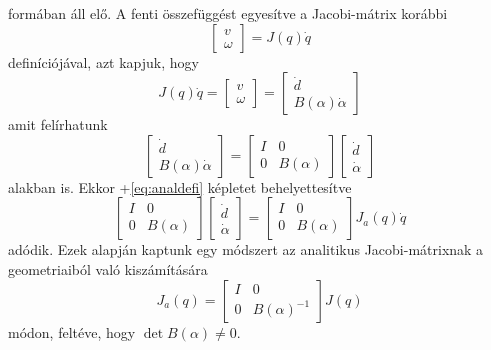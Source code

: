 \documentclass[12pt,a4paper]{report}
\theoremstyle{remark}
\theoremstyle{definition}
\begin{document}
formában áll elő. A fenti összefüggést egyesítve a Jacobi-mátrix korábbi
\begin{equation}
\begin{bmatrix}
v \\ 
\omega
\end{bmatrix} = J(q)\dot{q}
\end{equation}
definíciójával, azt kapjuk, hogy
\begin{equation}
J(q)\dot{q} = 
    \begin{bmatrix}
    v \\ 
    \omega
    \end{bmatrix} =
    \begin{bmatrix}
    \dot{d} \\ 
    B(\alpha)\dot{\alpha}
    \end{bmatrix}
\end{equation}
amit felírhatunk
\begin{equation}
\begin{bmatrix}
\dot{d} \\ 
B(\alpha)\dot{\alpha}
\end{bmatrix}
= \begin{bmatrix}
    I & 0 \\ 
    0 & B(\alpha)
    \end{bmatrix} 
    \begin{bmatrix}
    \dot{d} \\ 
    \dot{\alpha}
    \end{bmatrix}
\end{equation}
alakban is. Ekkor \az+\eqref{eq:analdefi} képletet behelyettesítve
\begin{equation}
\begin{bmatrix}
I & 0 \\ 
0 & B(\alpha)
\end{bmatrix} 
\begin{bmatrix}
\dot{d} \\ 
\dot{\alpha}
\end{bmatrix}
= \begin{bmatrix}
    I & 0 \\ 
    0 & B(\alpha)
    \end{bmatrix} J_a(q)\dot{q}
\end{equation}
adódik. Ezek alapján kaptunk egy módszert az analitikus Jacobi-mátrixnak a geometriaiból való kiszámítására
\begin{equation} \label{eq:geoanaljacobi}
J_a(q) = \begin{bmatrix}
    I & 0 \\ 
    0 & B(\alpha)^{-1}
    \end{bmatrix} J(q)
\end{equation}
módon, feltéve, hogy $\det B(\alpha) \neq 0$.
\end{document}
